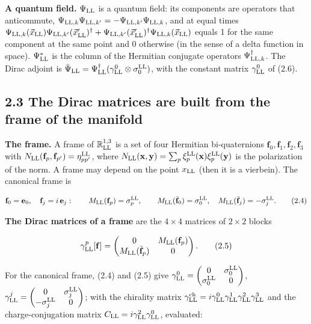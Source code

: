 \documentclass[
  10pt,
]{article}
\begin{document}
\textbf{A quantum field.} \(\Psi_{\rm LL}\) is a quantum field: its
components are operators that anticommute,
\(\Psi_{{\rm LL},k}\Psi_{{\rm LL},k'}=-\Psi_{{\rm LL},k'}\Psi_{{\rm LL},k}\),
and at equal times
\(\Psi_{{\rm LL},k}(\vec x_{\rm LL})\Psi_{{\rm LL},k'}(\vec x'_{\rm LL})^\dagger+\Psi_{{\rm LL},k'}(\vec x'_{\rm LL})^\dagger\Psi_{{\rm LL},k}(\vec x_{\rm LL})\)
equals 1 for the same component at the same point and 0 otherwise (in
the sense of a delta function in space). \(\Psi^*_{\rm LL}\) is the
column of the Hermitian conjugate operators
\(\Psi^\dagger_{{\rm LL},k}\). The Dirac adjoint is
\(\bar\Psi_{\rm LL}=\Psi^\dagger_{\rm LL}(\gamma^0_{\rm LL}\otimes\sigma^{\rm LL}_0)\),
with the constant matrix \(\gamma^0_{\rm LL}\) of (2.6).

\hypertarget{the-dirac-matrices-are-built-from-the-frame-of-the-manifold}{%
\subsection{2.3 The Dirac matrices are built from the frame of the
manifold}\label{the-dirac-matrices-are-built-from-the-frame-of-the-manifold}}

\textbf{The frame.} A frame of \(\mathbb R^{1,3}_{\rm LL}\) is a set of
four Hermitian bi-quaternions
\(\mathbf f_0,\mathbf f_1,\mathbf f_2,\mathbf f_3\) with
\(N_{\rm LL}(\mathbf f_p,\mathbf f_{p'})=\eta^{\rm LL}_{pp'}\), where
\(N_{\rm LL}(\mathbf x,\mathbf y)=\sum_p\xi^{\rm LL}_p(\mathbf x)\xi^{\rm LL}_p(\mathbf y)\)
is the polarization of the norm. A frame may depend on the point
\(x_{\rm LL}\) (then it is a vierbein). The canonical frame is

\[\mathbf f_0=\mathbf e_0,\quad\mathbf f_j=i\,\mathbf e_j:\qquad M_{\rm LL}(\mathbf f_p)=\sigma^{\rm LL}_p,\qquad M_{\rm LL}(\bar{\mathbf f}_0)=\sigma^{\rm LL}_0,\quad M_{\rm LL}(\bar{\mathbf f}_j)=-\sigma^{\rm LL}_j.\tag{2.4}\]

\textbf{The Dirac matrices of a frame} are the \(4\times4\) matrices of
\(2\times2\) blocks

\[\gamma^p_{\rm LL}[\mathbf f]=\begin{pmatrix}0&M_{\rm LL}(\mathbf f_p)\\M_{\rm LL}(\bar{\mathbf f}_p)&0\end{pmatrix}.\tag{2.5}\]

For the canonical frame, (2.4) and (2.5) give
\(\gamma^0_{\rm LL}=\begin{pmatrix}0&\sigma^{\rm LL}_0\\\sigma^{\rm LL}_0&0\end{pmatrix}\),
\(\gamma^j_{\rm LL}=\begin{pmatrix}0&\sigma^{\rm LL}_j\\-\sigma^{\rm LL}_j&0\end{pmatrix}\);
with the chirality matrix
\(\gamma^{\rm ch}_{\rm LL}=i\gamma^0_{\rm LL}\gamma^1_{\rm LL}\gamma^2_{\rm LL}\gamma^3_{\rm LL}\)
and the charge-conjugation matrix
\(C_{\rm LL}=i\gamma^2_{\rm LL}\gamma^0_{\rm LL}\), evaluated:
\end{document}
